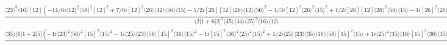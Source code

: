 \documentclass[varwidth, border=5pt]{standalone}
\begin{document}
\begin{my}
$\begin{gathered}
\scriptscriptstyle\frac{\langle23\rangle^3\langle16\rangle[12](-11/6i\langle12\rangle^2\langle56\rangle^2[12]^2+7/6i[12]^2\langle26\rangle\langle12\rangle\langle56\rangle\langle15\rangle-5/2i[26][12]\langle26\rangle\langle12\rangle\langle56\rangle^2-1/3i[12]^2\langle26\rangle^2\langle15\rangle^2+1/2i[26][12]\langle26\rangle^2\langle56\rangle\langle15\rangle-1i[26]^2\langle26\rangle^2\langle56\rangle^2)}{\langle2|1+6|2]^3\langle45\rangle\langle34\rangle\langle25\rangle^3\langle16\rangle\langle12\rangle}+\\
\scriptscriptstyle\frac{\langle35\rangle\langle6|1+2|5](-1i\langle23\rangle^2\langle56\rangle^2[15]^2\langle15\rangle^2-1i\langle25\rangle\langle23\rangle\langle56\rangle[15]^2\langle36\rangle\langle15\rangle^2-1i[15]^2\langle36\rangle^2\langle25\rangle^2\langle15\rangle^2+1/2i\langle25\rangle\langle23\rangle\langle35\rangle\langle16\rangle\langle56\rangle[15]^2\langle15\rangle+1i\langle25\rangle^2\langle35\rangle\langle16\rangle[15]^2\langle36\rangle\langle15\rangle-5/2i\langle25\rangle[25]\langle23\rangle^2\langle56\rangle^2[15]\langle15\rangle-2i\langle23\rangle^2\langle56\rangle^3[15][56]\langle15\rangle-5/2i[25]\langle25\rangle^2\langle23\rangle\langle56\rangle[15]\langle36\rangle\langle15\rangle-2i\langle25\rangle[56]\langle23\rangle\langle56\rangle^2[15]\langle36\rangle\langle15\rangle-1i[15]\langle36\rangle^2[25]\langle25\rangle^3\langle15\rangle-2i\langle25\rangle^2[56]\langle56\rangle[15]\langle36\rangle^2\langle15\rangle-1/3i\langle35\rangle^2[15]^2\langle25\rangle^2\langle16\rangle^2+7/6i[25]\langle25\rangle^2\langle23\rangle\langle35\rangle\langle16\rangle\langle56\rangle[15]+1/2i\langle25\rangle[56]\langle23\rangle\langle35\rangle\langle16\rangle\langle56\rangle^2[15]+1/3i\langle25\rangle^3[25]\langle35\rangle\langle16\rangle[15]\langle36\rangle+1i\langle25\rangle^2[56]\langle35\rangle\langle16\rangle\langle56\rangle[15]\langle36\rangle-11/6i\langle23\rangle^2\langle56\rangle^2[25]^2\langle25\rangle^2-5/2i\langle23\rangle^2[56]\langle56\rangle^3[25]\langle25\rangle-1i\langle23\rangle^2\langle56\rangle^4[56]^2-5/6i\langle23\rangle\langle56\rangle\langle36\rangle[25]^2\langle25\rangle^3-5/2i\langle25\rangle^2[25][56]\langle23\rangle\langle56\rangle^2\langle36\rangle-1i\langle23\rangle\langle56\rangle^3\langle36\rangle[56]^2\langle25\rangle-1/3i\langle36\rangle^2[25]^2\langle25\rangle^4-1i[56]\langle56\rangle\langle36\rangle^2[25]\langle25\rangle^3-1i\langle56\rangle^2\langle36\rangle^2[56]^2\langle25\rangle^2)}{\langle5|3+4|5]^3\langle45\rangle\langle34\rangle\langle25\rangle^3\langle16\rangle\langle12\rangle}\phantom{+}
\end{gathered}$
\end{my}
\end{document}

